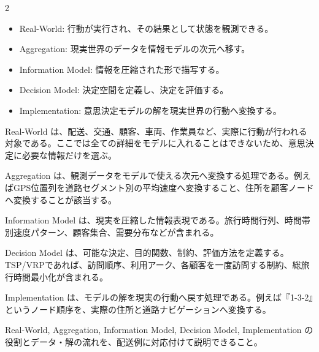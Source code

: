 \clearpage



\vspace{1.5mm}

\begin{multicols}{2}

\footnotesize

\raggedcolumns


\begin{itemize}
\item Real-World: 行動が実行され、その結果として状態を観測できる。
\item Aggregation: 現実世界のデータを情報モデルの次元へ移す。
\item Information Model: 情報を圧縮された形で描写する。
\item Decision Model: 決定空間を定義し、決定を評価する。
\item Implementation: 意思決定モデルの解を現実世界の行動へ変換する。
\end{itemize}

Real-World は、配送、交通、顧客、車両、作業員など、実際に行動が行われる対象である。ここでは全ての詳細をモデルに入れることはできないため、意思決定に必要な情報だけを選ぶ。\par

Aggregation は、観測データをモデルで使える次元へ変換する処理である。例えばGPS位置列を道路セグメント別の平均速度へ変換すること、住所を顧客ノードへ変換することが該当する。\par

Information Model は、現実を圧縮した情報表現である。旅行時間行列、時間帯別速度パターン、顧客集合、需要分布などが含まれる。\par

Decision Model は、可能な決定、目的関数、制約、評価方法を定義する。TSP/VRPであれば、訪問順序、利用アーク、各顧客を一度訪問する制約、総旅行時間最小化が含まれる。\par

Implementation は、モデルの解を現実の行動へ戻す処理である。例えば『1-3-2』というノード順序を、実際の住所と道路ナビゲーションへ変換する。\par

Real-World, Aggregation, Information Model, Decision Model, Implementation の役割とデータ・解の流れを、配送例に対応付けて説明できること。\par


\end{multicols}
